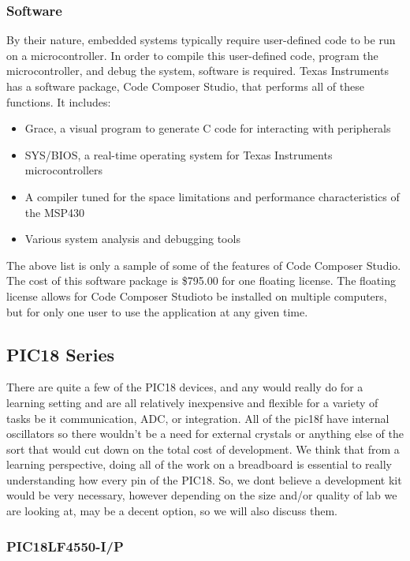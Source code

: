 \documentclass[12pt]{article}
\begin{document}
\subsubsection{Software}
By their nature, embedded systems typically require user-defined code to be run on a microcontroller. In order to compile this user-defined code, program the microcontroller, and debug the system, software is required. Texas Instruments has a software package, Code Composer Studio\texttrademark, that performs all of these functions. It includes: 
\begin{itemize}
  \item Grace\texttrademark, a visual program to generate C code for interacting with peripherals
  \item SYS/BIOS, a real-time operating system for Texas Instruments microcontrollers
  \item A compiler tuned for the space limitations and performance characteristics of the MSP430
  \item Various system analysis and debugging tools
\end{itemize}
The above list is only a sample of some of the features of Code Composer Studio. The cost of this software package is \$795.00 for one floating license. The floating license allows for Code Composer Studio\texttrademark to be installed on multiple computers, but for only one user to use the application at any given time.


\subsection{PIC18 Series}
There are quite a few of the PIC18 devices, and any would really do for a learning setting
and are all relatively inexpensive and flexible for a variety of tasks be it communication, ADC,
or integration. All of the pic18f have internal oscillators so there wouldn't be a need for external
crystals or anything else of the sort that would cut down on the total cost of development. We
think that from a learning perspective, doing all of the work on a breadboard is essential to really
understanding how every pin of the PIC18. So, we dont believe a development kit would be very
necessary, however depending on the size and/or quality of lab we are looking at, may be a decent
option, so we will also discuss them.

\subsubsection{PIC18LF4550-I/P}
\end{document}
